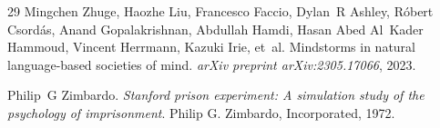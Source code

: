 \begin{thebibliography}{29}
Mingchen Zhuge, Haozhe Liu, Francesco Faccio, Dylan~R Ashley, R{\'o}bert Csord{\'a}s, Anand Gopalakrishnan, Abdullah Hamdi, Hasan Abed Al~Kader Hammoud, Vincent Herrmann, Kazuki Irie, et~al.
\newblock Mindstorms in natural language-based societies of mind.
\newblock \emph{arXiv preprint arXiv:2305.17066}, 2023.

Philip~G Zimbardo.
\newblock \emph{Stanford prison experiment: A simulation study of the psychology of imprisonment}.
\newblock Philip G. Zimbardo, Incorporated, 1972.

\end{thebibliography}
